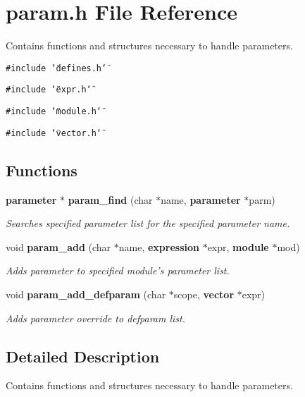 \section{param.h File Reference}
\label{param_8h}
Contains functions and structures necessary to handle parameters. 


{\tt \#include \char`\"{}defines.h\char`\"{}}\par
{\tt \#include \char`\"{}expr.h\char`\"{}}\par
{\tt \#include \char`\"{}module.h\char`\"{}}\par
{\tt \#include \char`\"{}vector.h\char`\"{}}\par
\subsection*{Functions}
\begin{CompactItemize}
\item 
{\bf parameter} $\ast$ {\bf param\_\-find} (char $\ast$name, {\bf parameter} $\ast$parm)
\begin{CompactList}\small\item\em Searches specified parameter list for the specified parameter name.\item\end{CompactList}\item 
void {\bf param\_\-add} (char $\ast$name, {\bf expression} $\ast$expr, {\bf module} $\ast$mod)
\begin{CompactList}\small\item\em Adds parameter to specified module's parameter list.\item\end{CompactList}\item 
void {\bf param\_\-add\_\-defparam} (char $\ast$scope, {\bf vector} $\ast$expr)
\begin{CompactList}\small\item\em Adds parameter override to defparam list.\item\end{CompactList}\end{CompactItemize}


\subsection{Detailed Description}
Contains functions and structures necessary to handle parameters.



